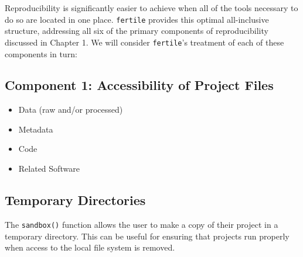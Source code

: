 \documentclass[12pt,twoside]{reedthesis}
\providecommand{\tightlist}{%
  \setlength{\itemsep}{0pt}\setlength{\parskip}{0pt}}
\begin{document}
Reproducibility is significantly easier to achieve when all of the tools
necessary to do so are located in one place. \texttt{fertile} provides
this optimal all-inclusive structure, addressing all six of the primary
components of reproducibility discussed in Chapter 1. We will consider
\texttt{fertile}'s treatment of each of these components in turn:

\subsection{Component 1: Accessibility of Project
Files}\label{component-1-accessibility-of-project-files}
\begin{itemize}
\tightlist
\item
  Data (raw and/or processed)
\item
  Metadata
\item
  Code
\item
  Related Software
\end{itemize}
\subsection{Temporary Directories}\label{temporary-directories}

The \texttt{sandbox()} function allows the user to make a copy of their
project in a temporary directory. This can be useful for ensuring that
projects run properly when access to the local file system is removed.
\end{document}

